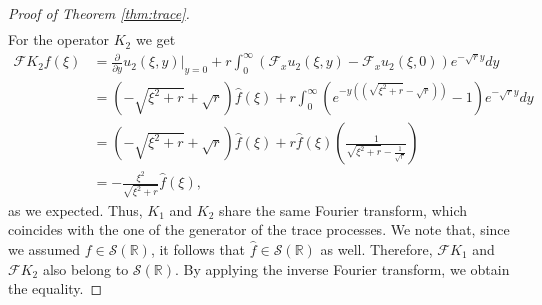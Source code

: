 \documentclass[11pt,a4paper]{article}
\theoremstyle{definition}
\theoremstyle{remark}
\begin{document}
\begin{proof}[Proof of Theorem \ref{thm:trace}]
\begin{align*}
		\end{align*}
		For the operator $K_2$ we get
		\begin{align*}
			\mathcal{F} K_2 f(\xi)&= \frac{\partial}{\partial y} u_2(\xi, y) \big\vert_{y=0} + r \int_0^\infty (\mathcal{F}_x u_2(\xi,y) - \mathcal{F}_x u_2(\xi,0)) e^{-\sqrt{r} y} dy\\
			&=(-\sqrt{\xi^2 +r} + \sqrt{r}) \widehat{f}(\xi) + r \int_0^\infty (e^{-y((\sqrt{\xi^2 +r} - \sqrt{r}))} - 1) e^{-\sqrt{r} y} dy\\
			&=(-\sqrt{\xi^2 +r} + \sqrt{r}) \widehat{f}(\xi) + r \widehat{f}(\xi) \left(\frac{1}{\sqrt{\xi^2 + r} - \frac{1}{\sqrt{r}}}\right)\\
			&=- \frac{\xi^2}{\sqrt{\xi^2 + r}} \widehat{f}(\xi),
		\end{align*}
		as we expected. Thus, \(K_1\) and \(K_2\) share the same Fourier transform, which coincides with the one of the generator of the trace processes. We note that, since we assumed \( f \in \mathcal{S}(\mathbb{R}) \), it follows that \( \widehat{f} \in \mathcal{S}(\mathbb{R}) \) as well. Therefore, \( \mathcal{F} K_1 \) and \( \mathcal{F} K_2 \) also belong to \( \mathcal{S}(\mathbb{R}) \).
		By applying the inverse Fourier transform, we obtain the equality.
\end{proof}
\end{document}
